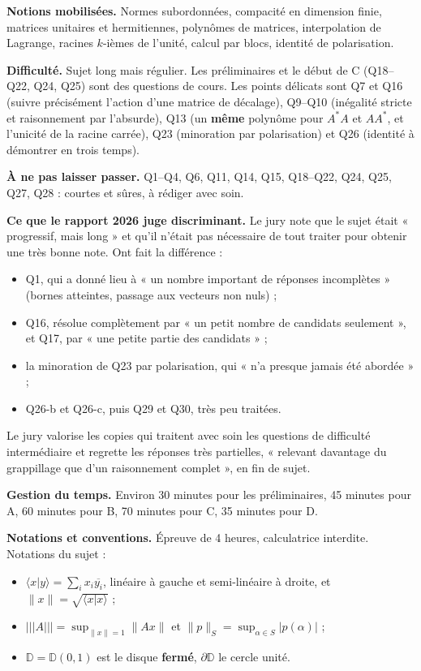\documentclass[11pt,a4paper]{article}
\providecommand{\tightlist}{\setlength{\itemsep}{0pt}\setlength{\parskip}{0pt}}
\begin{document}
\textbf{Notions mobilisées.} Normes subordonnées, compacité en dimension finie, matrices unitaires et hermitiennes, polynômes de matrices, interpolation de Lagrange, racines \(k\)-ièmes de l'unité, calcul par blocs, identité de polarisation.

\textbf{Difficulté.} Sujet long mais régulier. Les préliminaires et le début de C (Q18--Q22, Q24, Q25) sont des questions de cours. Les points délicats sont Q7 et Q16 (suivre précisément l'action d'une matrice de décalage), Q9--Q10 (inégalité stricte et raisonnement par l'absurde), Q13 (un \textbf{même} polynôme pour \(A^*A\) et \(AA^*\), et l'unicité de la racine carrée), Q23 (minoration par polarisation) et Q26 (identité à démontrer en trois temps).

\textbf{À ne pas laisser passer.} Q1--Q4, Q6, Q11, Q14, Q15, Q18--Q22, Q24, Q25, Q27, Q28 : courtes et sûres, à rédiger avec soin.

\textbf{Ce que le rapport 2026 juge discriminant.} Le jury note que le sujet était « progressif, mais long » et qu'il n'était pas nécessaire de tout traiter pour obtenir une très bonne note. Ont fait la différence :

\begin{itemize}
\tightlist
\item
  Q1, qui a donné lieu à « un nombre important de réponses incomplètes » (bornes atteintes, passage aux vecteurs non nuls) ;
\item
  Q16, résolue complètement par « un petit nombre de candidats seulement », et Q17, par « une petite partie des candidats » ;
\item
  la minoration de Q23 par polarisation, qui « n'a presque jamais été abordée » ;
\item
  Q26-b et Q26-c, puis Q29 et Q30, très peu traitées.
\end{itemize}

Le jury valorise les copies qui traitent avec soin les questions de difficulté intermédiaire et regrette les réponses très partielles, « relevant davantage du grappillage que d'un raisonnement complet », en fin de sujet.

\textbf{Gestion du temps.} Environ 30 minutes pour les préliminaires, 45 minutes pour A, 60 minutes pour B, 70 minutes pour C, 35 minutes pour D.

\textbf{Notations et conventions.} Épreuve de 4 heures, calculatrice interdite. Notations du sujet :

\begin{itemize}
\tightlist
\item
  \(\langle x|y\rangle=\sum_i x_i\overline{y_i}\), linéaire à gauche et semi-linéaire à droite, et \(\|x\|=\sqrt{\langle x|x\rangle}\) ;
\item
  \(\vert\!\vert\!\vert A\vert\!\vert\!\vert =\sup_{\|x\|=1}\|Ax\|\) et \(\|p\|_S=\sup_{\alpha\in S}|p(\alpha)|\) ;
\item
  \(\mathbb D=\mathbb D(0,1)\) est le disque \textbf{fermé}, \(\partial\mathbb D\) le cercle unité.
\end{itemize}
\end{document}
